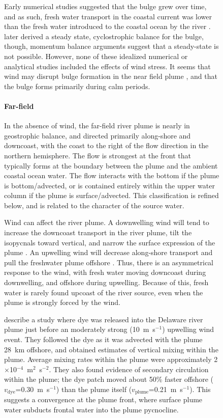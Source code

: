 \documentclass[11pt]{report}
\numberwithin{equation}{section}
\begin{document}
\begin{figure}
Early numerical studies suggested that the bulge grew over time, and as such, fresh water transport in the coastal current was lower than the fresh water introduced to the coastal ocean by the river \citep{fong.geyer:02}.  \citet{yankovsky.chapman:97} later derived a steady state, cyclostrophic balance for the bulge, though, momentum balance arguments \citep{nof.pichevin:01} suggest that a steady-state is not possible.  However, none of these idealized numerical or analytical studies included the effects of wind stress.  It seems that wind may disrupt bulge formation in the near field plume \citep{chant.ea:08, horner-devine.ea:08}, and that the bulge forms primarily during calm periods.


\paragraph{Far-field}

In the absence of wind, the far-field river plume is nearly in geostrophic balance, and directed primarily along-shore and downcoast, with the coast to the right of the flow direction in the northern hemisphere.  The flow is strongest at the front that typically forms at the boundary between the plume and the ambient coastal ocean water.  The flow interacts with the bottom if the plume is bottom\-/advected, or is contained entirely within the upper water column if the plume is surface\-/advected.  This classification is refined below, and is related to the character of the source water.

Wind can affect the river plume.  A downwelling wind will tend to increase the downcoast transport in the river plume, tilt the isopycnals toward vertical, and narrow the surface expression of the plume \citep{pullen.allen:00, garcia-berdeal.ea:02}.  An upwelling wind will decrease along-shore transport and pull the freshwater plume offshore \citep{fong.geyer:01, lentz:04}.  Thus, there is an asymmetrical response to the wind, with fresh water moving downcoast during downwelling, and offshore during upwelling.  Because of this, fresh water is rarely found upcoast of the river source, even when the plume is strongly forced by the wind.

\citet{houghton.ea:04} describe a study where dye was released into the Delaware river plume just before an moderately strong (10~m~s$^{-1}$) upwelling wind event.  They followed the dye as it was advected with the plume 28~km offshore, and obtained estimates of vertical mixing within the plume.  Average mixing rates within the plume were approximately 2$\times$10$^{-4}$~m$^2$~s$^{-2}$. They also found evidence of secondary circulation within the plume; the dye patch moved about 50\% faster offshore ($v_\mathrm{dye}$=0.30~m~s$^{-1}$) than the plume itself ($v_\mathrm{plume}$=0.21~m~s$^{-1}$).  This suggests a convergence at the plume front, where surface plume water subducts frontal water into the plume pycnocline.


\end{figure}
\end{document}
